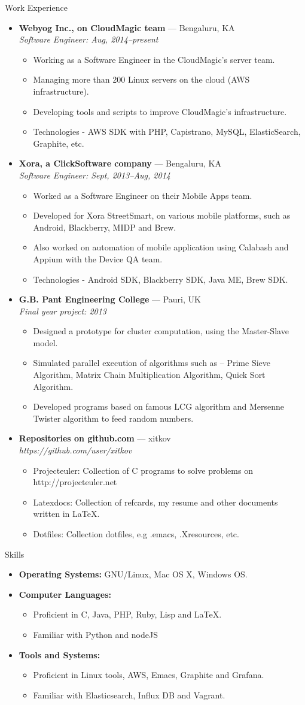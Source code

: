 \documentclass[11pt,oneside]{article}
\newenvironment{ressection}[1]{
  \vspace{4pt}
	     {\fontfamily{phv}\selectfont\Large#1}
	     \begin{itemize}
	       \vspace{3pt}
}{
	     \end{itemize}
}
\newcommand{\resitem}[1]{
  \vspace{-4pt}
\item \begin{flushleft} #1 \end{flushleft}
}
\newcommand{\ressubitem}[1]{
  \vspace{-1pt}
\item \begin{flushleft} #1 \end{flushleft}
}
\newcommand{\resbigitem}[3]{
  \vspace{-5pt}
\item
  \textbf{#1} --- #2 \\
  \textit{#3}
}
\newenvironment{ressubsec}[3]{
  \resbigitem{#1}{#2}{#3}
  \vspace{-2pt}
  \begin{itemize}
}{
  \end{itemize}
}
\newenvironment{reslist}[1]{
  \resitem{\textbf{#1}}
  \vspace{-5pt}
  \begin{itemize}
}{
  \end{itemize}
}
\begin{document}
\begin{ressection}{Work Experience}
  \begin{ressubsec}{Webyog Inc., on CloudMagic team}{Bengaluru, KA}{Software Engineer: Aug, 2014--present}
    \ressubitem{Working as a Software Engineer in the CloudMagic's server team.}
    \ressubitem{Managing more than 200 Linux servers on the cloud (AWS infrastructure).}
    \ressubitem{Developing tools and scripts to improve CloudMagic's infrastructure.}
    \ressubitem{Technologies - AWS SDK with PHP, Capistrano, MySQL, ElasticSearch, Graphite, etc.}
  \end{ressubsec}
  \begin{ressubsec}{Xora, a ClickSoftware company}{Bengaluru, KA}{Software Engineer: Sept, 2013--Aug, 2014}
    \ressubitem{Worked as a Software Engineer on their Mobile Apps team.}
    \ressubitem{Developed for Xora StreetSmart, on various mobile platforms, such as Android, Blackberry, MIDP and Brew.}
    \ressubitem{Also worked on automation of mobile application using Calabash and Appium with the Device QA team.}
    \ressubitem{Technologies - Android SDK, Blackberry SDK, Java ME, Brew SDK.}
  \end{ressubsec}
  \begin{ressubsec}{G.B. Pant Engineering College}{Pauri, UK}{Final year project: 2013}
    \ressubitem{Designed a prototype for cluster computation, using the Master-Slave model.}
    \ressubitem{Simulated parallel execution of algorithms such as -- Prime Sieve Algorithm, Matrix Chain Multiplication Algorithm, Quick Sort Algorithm.}
    \ressubitem{Developed programs based on famous LCG algorithm and Mersenne Twister algorithm to feed random numbers.}
  \end{ressubsec} 
  \begin{ressubsec}{Repositories on github.com}{xitkov}{https://github.com/user/xitkov}
    \ressubitem{Projecteuler: Collection of C programs to solve problems on http://projecteuler.net}
    \ressubitem{Latexdocs:  Collection of refcards, my resume and other documents written in \LaTeX.}
    \ressubitem{Dotfiles: Collection dotfiles, e.g .emacs, .Xresources, etc.}
  \end{ressubsec} 
\end{ressection}


\begin{ressection}{Skills}
  \resitem{\textbf{Operating Systems:} GNU/Linux, Mac OS X, Windows OS.}
  \begin{reslist}{Computer Languages:}
	\ressubitem{Proficient in C, Java, PHP, Ruby, Lisp and \LaTeX.}
    \ressubitem{Familiar with Python and nodeJS}
  \end{reslist}
  \begin{reslist}{Tools and Systems:}
    \ressubitem{Proficient in Linux tools, AWS, Emacs, Graphite and Grafana.}
    \ressubitem{Familiar with Elasticsearch, Influx DB and Vagrant.}
  \end{reslist}
\end{ressection}
\end{document}
